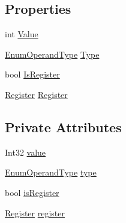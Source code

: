 \subsection*{Properties}
\begin{DoxyCompactItemize}
\item 
int \hyperlink{class_c_p_u___o_s___simulator_1_1_c_p_u_1_1_operand_ab109292eba2094db4d7f21cbdbd5bc9e}{Value}
\item 
\hyperlink{namespace_c_p_u___o_s___simulator_1_1_c_p_u_ad49cfe442b74115a326c03b7ae848f76}{Enum\+Operand\+Type} \hyperlink{class_c_p_u___o_s___simulator_1_1_c_p_u_1_1_operand_a0b0deae57b760df3a083dc54535b0891}{Type}
\item 
bool \hyperlink{class_c_p_u___o_s___simulator_1_1_c_p_u_1_1_operand_a662aacb6eb1aa9cf818181aea695e0c9}{Is\+Register}
\item 
\hyperlink{class_c_p_u___o_s___simulator_1_1_c_p_u_1_1_register}{Register} \hyperlink{class_c_p_u___o_s___simulator_1_1_c_p_u_1_1_operand_a8f08360f0e27922fc0377f5d58a9e67f}{Register}
\end{DoxyCompactItemize}
\subsection*{Private Attributes}
\begin{DoxyCompactItemize}
\item 
Int32 \hyperlink{class_c_p_u___o_s___simulator_1_1_c_p_u_1_1_operand_ab418a225965ed7e8d07649b218a7edd4}{value}
\item 
\hyperlink{namespace_c_p_u___o_s___simulator_1_1_c_p_u_ad49cfe442b74115a326c03b7ae848f76}{Enum\+Operand\+Type} \hyperlink{class_c_p_u___o_s___simulator_1_1_c_p_u_1_1_operand_abc8f504a22e9a5c49d91b12f61cc5119}{type}
\item 
bool \hyperlink{class_c_p_u___o_s___simulator_1_1_c_p_u_1_1_operand_a16cc03d0d4c600b864d9c189529a473d}{is\+Register}
\item 
\hyperlink{class_c_p_u___o_s___simulator_1_1_c_p_u_1_1_register}{Register} \hyperlink{class_c_p_u___o_s___simulator_1_1_c_p_u_1_1_operand_a55d446765a50844fcbbc56b757b1b679}{register}
\end{DoxyCompactItemize}


